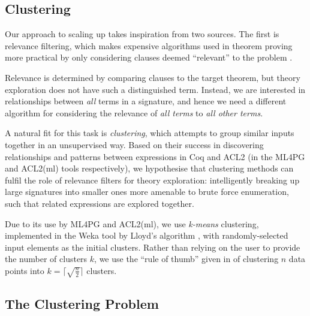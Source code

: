 \subsection{Clustering}
\label{sec:clustering}

Our approach to scaling up \qspec{} takes inspiration from two sources. The first is relevance filtering, which makes expensive algorithms used in theorem proving more practical by only considering clauses deemed ``relevant'' to the problem \cite{meng2009lightweight}.

Relevance is determined by comparing clauses to the target theorem, but theory exploration does not have such a distinguished term. Instead, we are interested in relationships between \emph{all} terms in a signature, and hence we need a different algorithm for considering the relevance of \emph{all terms} to \emph{all other terms}.

A natural fit for this task is \emph{clustering}, which attempts to group similar inputs together in an unsupervised way. Based on their success in discovering relationships and patterns between expressions in Coq and ACL2 (in the ML4PG and ACL2(ml) tools respectively), we hypothesise that clustering methods can fulfil the role of relevance filters for theory exploration: intelligently breaking up large signatures into smaller ones more amenable to brute force enumeration, such that related expressions are explored together.

Due to its use by ML4PG and ACL2(ml), we use \emph{k-means} clustering, implemented in the Weka tool \cite{Holmes.Donkin.Witten:1994} by Lloyd's algorithm \cite{lloyd1982least}, with randomly-selected input elements as the initial clusters. Rather than relying on the user to provide the number of clusters $k$, we use the ``rule of thumb'' given in \cite[pp. 365]{mardia1979multivariate} of clustering $n$ data points into $k = \lceil \sqrt{\frac{n}{2}} \rceil$ clusters.

\subsection{The Clustering Problem}
\label{sec:clustering}

